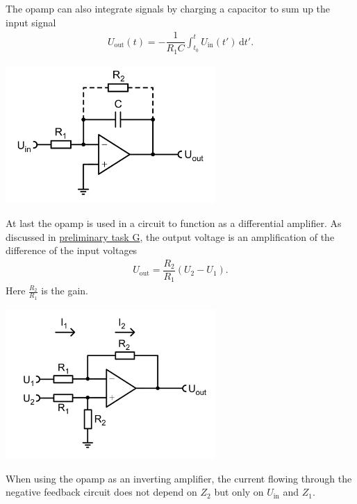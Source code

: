 \documentclass[a4paper,10pt]{article}
\newcommand{\td}{\,\text{d}}
\newenvironment{Figure}
        {\par\medskip\noindent\minipage{\linewidth}}
        {\endminipage\par\medskip}
\numberwithin{equation}{section}
\begin{document}
\begin{multicols}{2}
\begin{Figure}
	\end{Figure}
	\noindent The opamp can also integrate signals by charging a capacitor to sum up the input signal
	\begin{align}
		U_\text{out}\left(t\right)=-\dfrac{1}{R_1C}\int_{t_0}^{t}U_\text{in}\left(t'\right)\td t'
		.\end{align}
	\begin{Figure}
		\centering
		\includegraphics[width=0.6\textwidth]{integrator.png}
	\end{Figure}
	\noindent At last the opamp is used in a circuit to function as a differential amplifier.
	As discussed in \hyperref[pre:G]{preliminary task G}, the output voltage is an amplification of the difference of the input voltages
	\begin{align}
		U_\text{out}=\dfrac{R_2}{R_1}\left(U_2-U_1\right)
		.\end{align}
	Here $\tfrac{R_2}{R_1}$ is the gain.
	\begin{Figure}
		\centering
		\includegraphics[width=0.6\textwidth]{differential_amp.png}
	\end{Figure}
	\noindent When using the opamp as an inverting amplifier, the current flowing through the negative feedback circuit does not depend on $Z_2$ but only on $U_\text{in}$ and $Z_1$.

\end{multicols}
\end{document}
